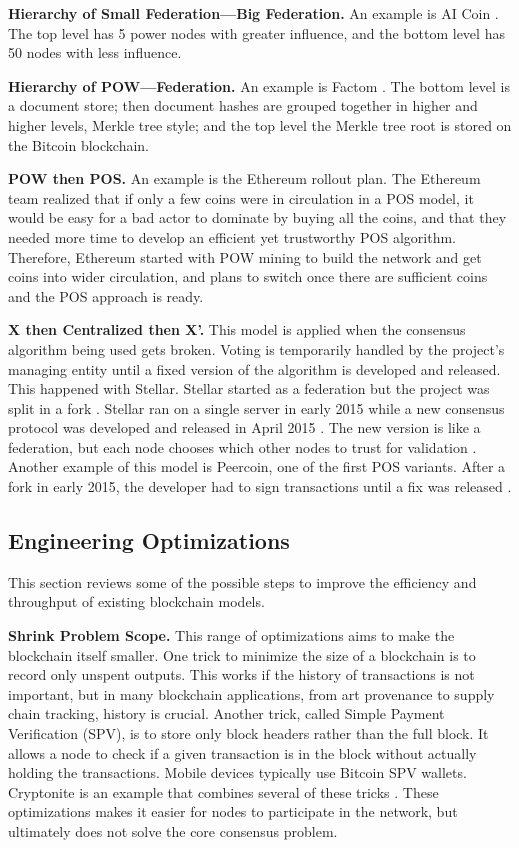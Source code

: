 \medskip
\noindent\textbf{Hierarchy of Small Federation—Big Federation.} An example is AI Coin \cite{aicoin}. 
The top level has 5 power nodes with greater influence, and the bottom level has 50 nodes with less influence.

\medskip
\noindent\textbf{Hierarchy of POW—Federation.} An example is Factom \cite{factom}. 
The bottom level is a document store; then document hashes are grouped together in higher and higher levels, Merkle tree style; and the top level the Merkle tree root is stored on the Bitcoin blockchain.

\medskip
\noindent\textbf{POW then POS.} An example is the Ethereum rollout plan. 
The Ethereum team realized that if only a few coins were in circulation in a POS model, it would be easy for a bad actor to dominate by buying all the coins, and that they needed more time to develop an efficient yet trustworthy POS algorithm. 
Therefore, Ethereum started with POW mining to build the network and get coins into wider circulation, and plans to switch once there are sufficient coins and the POS approach is ready.

\medskip
\noindent\textbf{X then Centralized then X’.} This model is applied when the consensus algorithm being used gets broken. 
Voting is temporarily handled by the project’s managing entity until a fixed version of the algorithm is developed and released. 
This happened with Stellar. Stellar started as a federation but the project was split in a fork \cite{kim2014safety}. 
Stellar ran on a single server in early 2015 while a new consensus protocol \cite{mazieres2015stellar} was developed and released in April 2015 \cite{kim2014stellar}. 
The new version is like a federation, but each node chooses which other nodes to trust for validation \cite{mazieres2015stellar}. 
Another example of this model is Peercoin, one of the first POS variants. After a fork in early 2015, the developer had to sign transactions until a fix was released \cite{peercoin}.

\subsection{Engineering Optimizations}
This section reviews some of the possible steps to improve the efficiency and throughput of existing blockchain models.

\medskip
\noindent\textbf{Shrink Problem Scope.} This range of optimizations aims to make the blockchain itself smaller. 
One trick to minimize the size of a blockchain is to record only unspent outputs. 
This works if the history of transactions is not important, but in many blockchain applications, from art provenance to supply chain tracking, history is crucial. 
Another trick, called Simple Payment Verification (SPV), is to store only block headers rather than the full block. 
It allows a node to check if a given transaction is in the block without actually holding the transactions. 
Mobile devices typically use Bitcoin SPV wallets. Cryptonite is an example that combines several of these tricks \cite{cryptonite}. 
These optimizations makes it easier for nodes to participate in the network, but ultimately does not solve the core consensus problem.

